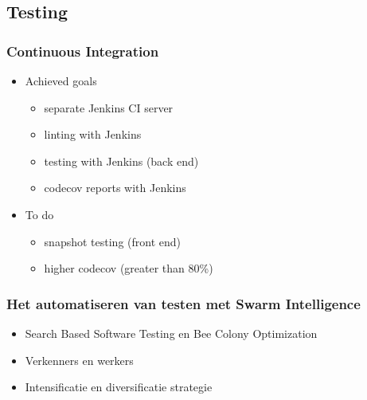\documentclass[12pt]{beamer}
\begin{document}
    \subsection{Testing}
    \begin{frame}
        \frametitle{Continuous Integration}
        \begin{itemize}
            \item Achieved goals
            \begin{itemize}
                \item separate Jenkins CI server
                \item linting with Jenkins
                \item testing with Jenkins (back end)
                \item codecov reports with Jenkins
            \end{itemize}
            \item To do
            \begin{itemize}
                \item snapshot testing (front end)
                \item higher codecov (greater than 80\%)
            \end{itemize}
        \end{itemize}
    \end{frame}

    \begin{frame}
        \frametitle{Het automatiseren van testen met Swarm Intelligence}
        \begin{itemize}
            \item Search Based Software Testing en Bee Colony Optimization
            \item Verkenners en werkers
            \item Intensificatie en diversificatie strategie
        \end{itemize}
    \end{frame}
\end{document}
